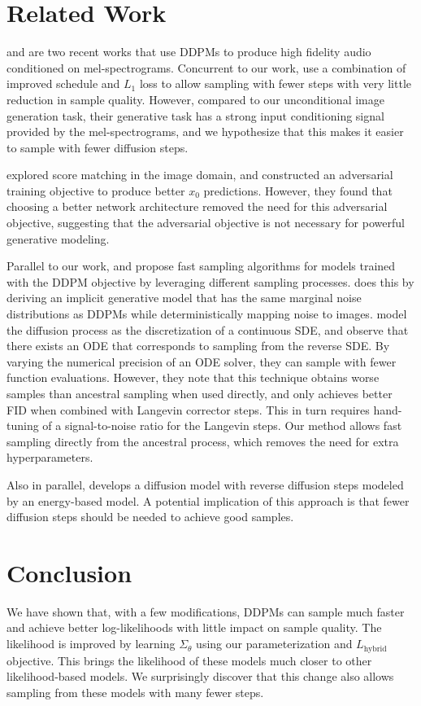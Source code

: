 \documentclass{article}
\begin{document}
\section{Related Work}
\citet{wavegrad} and \citet{diffwave} are two recent works that use DDPMs to produce high fidelity audio conditioned on mel-spectrograms. Concurrent to our work, \citet{wavegrad} use a combination of improved schedule and $L_1$ loss to allow sampling with fewer steps with very little reduction in sample quality. However, compared to our unconditional image generation task, their generative task has a strong input conditioning signal provided by the mel-spectrograms, and we hypothesize that this makes it easier to sample with fewer diffusion steps.

\citet{adversarial} explored score matching in the image domain, and constructed an adversarial training objective to produce better $x_0$ predictions. However, they found that choosing a better network architecture removed the need for this adversarial objective, suggesting that the adversarial objective is not necessary for powerful generative modeling.

Parallel to our work, \citet{ddim} and \citet{sde} propose fast sampling algorithms for models trained with the DDPM objective by leveraging different sampling processes. \citet{ddim} does this by deriving an implicit generative model that has the same marginal noise distributions as DDPMs while deterministically mapping noise to images. \citet{sde} model the diffusion process as the discretization of a continuous SDE, and observe that there exists an ODE that corresponds to sampling from the reverse SDE. By varying the numerical precision of an ODE solver, they can sample with fewer function evaluations. However, they note that this technique obtains worse samples than ancestral sampling when used directly, and only achieves better FID when combined with Langevin corrector steps. This in turn requires hand-tuning of a signal-to-noise ratio for the Langevin steps. Our method allows fast sampling directly from the ancestral process, which removes the need for extra hyperparameters.

Also in parallel, \citet{ebmdiffusion} develops a diffusion model with reverse diffusion steps modeled by an energy-based model. A potential implication of this approach is that fewer diffusion steps should be needed to achieve good samples.

\section{Conclusion}
We have shown that, with a few modifications, DDPMs can sample much faster and achieve better log-likelihoods with little impact on sample quality. The likelihood is improved by learning $\Sigma_{\theta}$ using our parameterization and $L_{\text{hybrid}}$ objective. This brings the likelihood of these models much closer to other likelihood-based models. We surprisingly discover that this change also allows sampling from these models with many fewer steps. 
\end{document}
